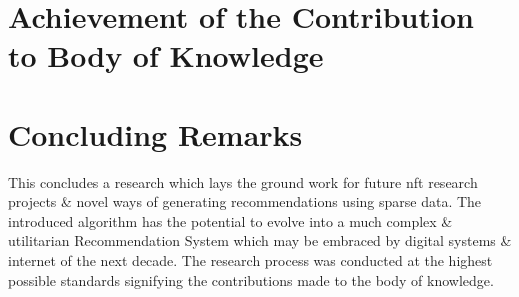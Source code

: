 \section{Achievement of the Contribution to Body of Knowledge}


\section{Concluding Remarks}
This concludes a research which lays the ground work for future \gls{nft} research projects \& novel ways of generating recommendations using sparse data. The introduced algorithm has the potential to evolve into a much complex \& utilitarian Recommendation System which may be embraced by digital systems \& internet of the next decade.
The research process was conducted at the highest possible standards signifying the contributions made to the body of knowledge.